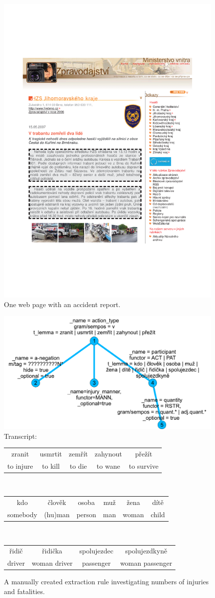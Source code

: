 \begin{figure}
	\centering
		\includegraphics[width=0.5\hsize]{../img/ch3_article}
	\caption{One web page with an accident report.}
	\label{fig:ch3_article}
\end{figure}


\begin{figure}
	\centering
		\includegraphics[width=0.5\hsize]{../img/ch3_extract_patern}		
\\Transcript:\\
\begin{tabular}{|c|c|c|c|c|}
\hline
zranit & usmrtit & zemřít & zahynout & přežít\\
to injure & to kill & to die & to wane & to survive\\
\hline
\end{tabular}
\\\begin{tabular}{|c|c|c|c|c|c|}
\hline
kdo & člověk & osoba & muž & žena & dítě\\
somebody & (hu)man & person & man & woman & child\\
\hline
\end{tabular}
\\\begin{tabular}{|c|c|c|c|}
\hline
řidič & řidička & spolujezdec & spolujezdkyně\\
driver & woman driver & passenger & woman passenger\\	
\hline
\end{tabular}		
	\caption{A manually created extraction rule investigating numbers of injuries and fatalities.}
	\label{fig:ch3_extract_patern}
\end{figure}

